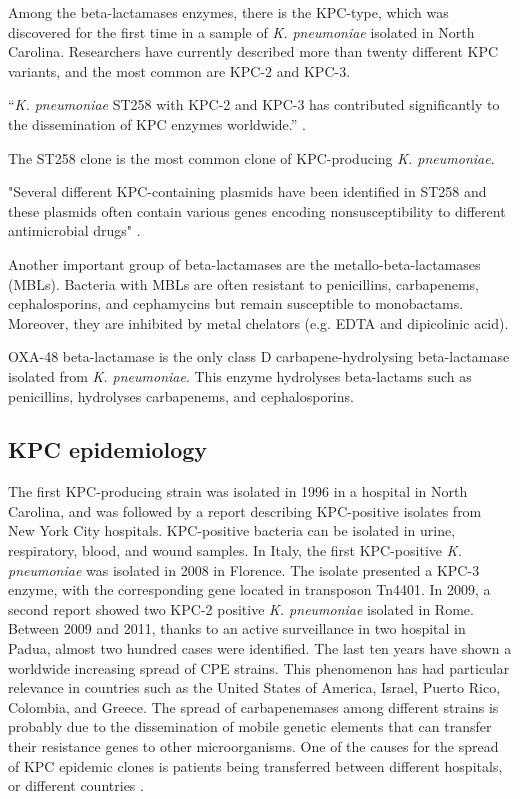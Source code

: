 \documentclass[11pt]{report}
\begin{document}
Among the beta-lactamases enzymes, there is the KPC-type, which was discovered for the first time in a sample of \emph{K. pneumoniae} isolated in North Carolina.
Researchers have currently described more than twenty different KPC variants, and the most common are KPC-2 and KPC-3.

``\emph{K. pneumoniae} ST258 with KPC-2 and KPC-3 has contributed significantly to the dissemination of KPC enzymes worldwide.''
\cite{Pitout2015}.

The ST258 clone is the most common clone of KPC-producing \emph{K. pneumoniae}.

"Several different KPC-containing plasmids have been identified in ST258 and these plasmids often contain various genes encoding nonsusceptibility to different antimicrobial drugs" \cite{Pitout2015}.

Another important group of beta-lactamases are the metallo-beta-lactamases (MBLs).
Bacteria with MBLs are often resistant to penicillins, carbapenems, cephalosporins, and cephamycins but remain susceptible to monobactams. Moreover, they are inhibited by metal chelators (e.g. EDTA and dipicolinic acid).

OXA-48 beta-lactamase is the only class D carbapene-hydrolysing beta-lactamase isolated from \emph{K. pneumoniae}.
This enzyme hydrolyses beta-lactams such as penicillins, hydrolyses carbapenems, and cephalosporins.


\subsection{KPC epidemiology}

The first KPC-producing strain was isolated in 1996 in a hospital in North Carolina, and was followed by a report describing KPC-positive isolates from New York City hospitals.
KPC-positive bacteria can be isolated in urine, respiratory, blood, and wound samples.
In Italy, the first KPC-positive \emph{K. pneumoniae} was isolated in 2008 in Florence.
The isolate presented a KPC-3 enzyme, with the corresponding gene located in transposon Tn4401.
In 2009, a second report showed two KPC-2 positive \emph{K. pneumoniae} isolated in Rome.
Between 2009 and 2011, thanks to an active surveillance in two hospital in Padua, almost two hundred cases were identified.
\cite{MunozPrice2013}
The last ten years have shown a worldwide increasing spread of CPE strains.
This phenomenon has had particular relevance in countries such as the United States of America, Israel, Puerto Rico, Colombia, and Greece.
The spread of carbapenemases among different strains is probably due to the dissemination of mobile genetic elements that can transfer their resistance genes to other microorganisms.
One of the causes for the spread of KPC epidemic clones is patients being transferred between different hospitals, or different countries \cite{circolare2013}.
\end{document}
